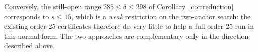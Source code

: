 Conversely, the still-open range $285\le\delta\le298$ of
Corollary~\ref{cor:reduction} corresponds to $s\le15$, which is a \emph{weak}
restriction on the two-anchor search: the existing order-$25$ certificates
therefore do very little to help a full order-$25$ run in this normal form.  The
two approaches are complementary only in the direction described above.
